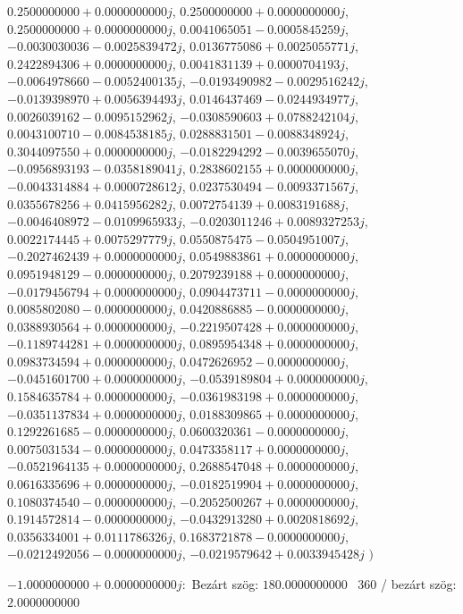\documentclass[14pt,a4paper]{article}
\begin{document}
\begin{itemize}
$0.2500000000+0.0000000000j$, $0.2500000000+0.0000000000j$, $0.2500000000+0.0000000000j$, $0.0041065051-0.0005845259j$, $-0.0030030036-0.0025839472j$, $0.0136775086+0.0025055771j$, $0.2422894306+0.0000000000j$, $0.0041831139+0.0000704193j$, $-0.0064978660-0.0052400135j$, $-0.0193490982-0.0029516242j$, $-0.0139398970+0.0056394493j$, $0.0146437469-0.0244934977j$, $0.0026039162-0.0095152962j$, $-0.0308590603+0.0788242104j$, $0.0043100710-0.0084538185j$, $0.0288831501-0.0088348924j$, $0.3044097550+0.0000000000j$, $-0.0182294292-0.0039655070j$, $-0.0956893193-0.0358189041j$, $0.2838602155+0.0000000000j$, $-0.0043314884+0.0000728612j$, $0.0237530494-0.0093371567j$, $0.0355678256+0.0415956282j$, $0.0072754139+0.0083191688j$, $-0.0046408972-0.0109965933j$, $-0.0203011246+0.0089327253j$, $0.0022174445+0.0075297779j$, $0.0550875475-0.0504951007j$, $-0.2027462439+0.0000000000j$, $0.0549883861+0.0000000000j$, $0.0951948129-0.0000000000j$, $0.2079239188+0.0000000000j$, $-0.0179456794+0.0000000000j$, $0.0904473711-0.0000000000j$, $0.0085802080-0.0000000000j$, $0.0420886885-0.0000000000j$, $0.0388930564+0.0000000000j$, $-0.2219507428+0.0000000000j$, $-0.1189744281+0.0000000000j$, $0.0895954348+0.0000000000j$, $0.0983734594+0.0000000000j$, $0.0472626952-0.0000000000j$, $-0.0451601700+0.0000000000j$, $-0.0539189804+0.0000000000j$, $0.1584635784+0.0000000000j$, $-0.0361983198+0.0000000000j$, $-0.0351137834+0.0000000000j$, $0.0188309865+0.0000000000j$, $0.1292261685-0.0000000000j$, $0.0600320361-0.0000000000j$, $0.0075031534-0.0000000000j$, $0.0473358117+0.0000000000j$, $-0.0521964135+0.0000000000j$, $0.2688547048+0.0000000000j$, $0.0616335696+0.0000000000j$, $-0.0182519904+0.0000000000j$, $0.1080374540-0.0000000000j$, $-0.2052500267+0.0000000000j$, $0.1914572814-0.0000000000j$, $-0.0432913280+0.0020818692j$, $0.0356334001+0.0111786326j$, $0.1683721878-0.0000000000j$, $-0.0212492056-0.0000000000j$, $-0.0219579642+0.0033945428j$
$\big)$
\end{itemize}
$-1.0000000000+0.0000000000j$:\
Bezárt szög: $180.0000000000$ \
360 / bezárt szög: $2.0000000000$\
\end{document}
